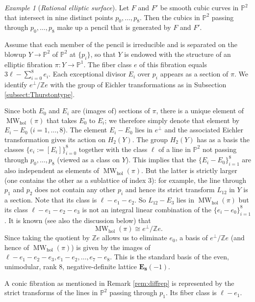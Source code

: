 \documentclass[10pt,letterpaper]{amsart}
\numberwithin{equation}{section}
\def\PP{{\mathbb P}}
\def\ZZ{{\mathbb Z}}
\def\hol{\mathrm{hol}}
\newcommand\MW{\operatorname{MW}}
\theoremstyle{remark}
\newtheorem{example}[theorem]{Example}
\begin{document}
\begin{example}[{\em Rational elliptic surface}]
\label{example:rationalelliptic}
Let $F$ and $F'$ be smooth cubic curves in $\PP^2$ that intersect in nine distinct points 
$p_0, \dots , p_8$. Then the   cubics in $\PP^2$ passing through $p_0, \dots , p_8$ make up a pencil that is generated by $F$ and $F'$. 

Assume that each member of the pencil is irreducible and 
is separated on the blowup $Y\to \PP^2$ of $\PP^2$ at $\{p_i\}$, so that 
$Y$ is endowed with the structure of an elliptic fibration $\pi : Y\to \PP^1$.  The fiber class  $e$ of this fibration equals  $3\ell-\sum_{i=0}^8  e_i$. Each exceptional divisor $E_i$ over $p_i$ appears as a section of $\pi$. We identify $e^\perp/\ZZ e$ with the group of Eichler transformations as in Subsection \ref{subsect:Thurstontype}. 

Since both $E_0$ and $E_i$ are (images of) sections of $\pi$, there is a unique element of 
$\MW_{\hol}(\pi)$ that takes $E_0$ to $E_i$; we therefore simply denote that element by $E_i-E_0$ ($i=1, \dots, 8$).  The element 
$E_i-E_0$ lies in $e^\perp$ and  the associated Eichler transformation gives its  action on $H_2(Y)$.
The group $H_2(Y)$ has as a basis the classes $\{e_i:=[E_i]\}_{i=0}^8$ together with the class  $\ell$ of a line in $\PP^2$ not passing through $p_0, \dots , p_8$ (viewed as a class on $Y$).
This implies that the $\{E_i-E_0\}_{i=1}^8$ are also independent as elements of $\MW_{\hol}(\pi)$.  But the latter is strictly larger (one contains the other as a sublattice of index 3): for example, 
the line through $p_1$ and $p_2$ does not contain any other $p_i$ and hence its strict transform $L_{12}$ in $Y$ is a section. Note that its class is $\ell-e_1-e_2$.
So $L_{12}-E_3$ lies in $\MW_{\hol}(\pi)$ but its class $\ell-e_1-e_2-e_3$ is not an integral linear combination of the $\{e_i-e_0\}_{i=1}^8$. It is known (see also the discussion below) that 
\[
\MW_{\hol}(\pi)\cong e^\perp/\ZZ e.
\] 
 Since taking the quotient by $\ZZ e$ allows us to eliminate $e_0$,  a basis of $e^\perp/\ZZ e$ (and hence of  $\MW_{\hol}(\pi)$) is given by the images of 
$\ell -e_1-e_2-e_3, e_1-e_2,\dots , e_7-e_8$.  This is the standard basis of the even, unimodular, rank $8$, negative-definite  lattice $\mathbf{E_8}(-1)$. 

A conic fibration as mentioned in Remark \ref{rem:diffrep} is represented by the strict transforms of the lines in $\PP^2$ passing through $p_1$. Its fiber class  is $\ell-e_1$. 
\end{example}
\end{document}
